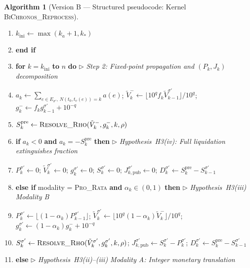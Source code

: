 \documentclass[11pt, a4paper]{article}
\theoremstyle{definition}
\newtheorem{algoritmo}[definicao]{Algorithm}
\theoremstyle{plain}
\theoremstyle{remark}
\begin{document}
\begin{algoritmo}[Version B — Structured pseudocode: Kernel \textsc{BiChronos\_Reprocess}]
\begin{enumerate}[label=\footnotesize\textbf{\arabic*:}, leftmargin=2.2em, itemsep=0.15em, topsep=0.3em]
    \item \hspace{1.2em} $k_{\text{ini}} \leftarrow \max(k_a + 1, k_*)$
    \item \textbf{end if}
    \item \textbf{for} $k = k_{\text{ini}}$ \textbf{to} $n$ \textbf{do} \hfill $\triangleright$ \emph{Step 2: Fixed-point propagation and $(P_k, J_k)$ decomposition}
    \item \hspace{1.2em} $a_k \leftarrow \sum_{e \in E_{\sigma'},\, N(t_0, t_v(e)) = k} a(e)$; \quad $\tilde{V}_k^- \leftarrow \lfloor 10^q f_k \tilde{V}_{k-1}^{\sigma'} \rfloor / 10^q$; \quad $g_k^- \leftarrow f_k g_{k-1}^{\sigma'} + 10^{-q}$
    \item \hspace{1.2em} $S_k^{\text{pre}} \leftarrow \textsc{Resolve\_Rho}(\tilde{V}_k^-, g_k^-, k, \rho)$
    \item \hspace{1.2em} \textbf{if} $a_k < 0$ \textbf{and} $a_k = -S_k^{\text{pre}}$ \textbf{then} \hfill $\triangleright$ \emph{Hypothesis~H3(iv): Full liquidation extinguishes fraction}
    \item \hspace{2.4em} $P_k^{\sigma'} \leftarrow 0$; \quad $\tilde{V}_k^{\sigma'} \leftarrow 0$; \quad $g_k^{\sigma'} \leftarrow 0$; \quad $S_k^{\sigma'} \leftarrow 0$; \quad $J_{k,\text{pub}}^{\sigma'} \leftarrow 0$; \quad $D_k^{\sigma'} \leftarrow S_k^{\text{pre}} - S_{k-1}^{\sigma'}$
    \item \hspace{1.2em} \textbf{else if} modality = \textsc{Pro\_Rata} \textbf{and} $\alpha_k \in (0, 1)$ \textbf{then} \hfill $\triangleright$ \emph{Hypothesis~H3(iii) Modality B}
    \item \hspace{2.4em} $P_k^{\sigma'} \leftarrow \lfloor (1 - \alpha_k) P_{k-1}^{\sigma'} \rfloor$; \quad $\tilde{V}_k^{\sigma'} \leftarrow \lfloor 10^q (1 - \alpha_k)\tilde{V}_k^- \rfloor / 10^q$; \quad $g_k^{\sigma'} \leftarrow (1 - \alpha_k)g_k^- + 10^{-q}$
    \item \hspace{2.4em} $S_k^{\sigma'} \leftarrow \textsc{Resolve\_Rho}(\tilde{V}_k^{\sigma'}, g_k^{\sigma'}, k, \rho)$; \quad $J_{k,\text{pub}}^{\sigma'} \leftarrow S_k^{\sigma'} - P_k^{\sigma'}$; \quad $D_k^{\sigma'} \leftarrow S_k^{\text{pre}} - S_{k-1}^{\sigma'}$
    \item \hspace{1.2em} \textbf{else} \hfill $\triangleright$ \emph{Hypothesis~H3(ii)--(iii) Modality A: Integer monetary translation}

\end{enumerate}
\end{algoritmo}
\end{document}
